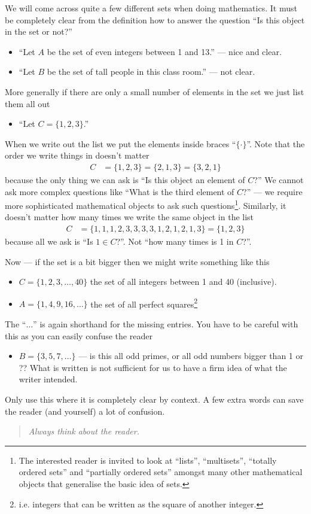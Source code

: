 We will come across quite a few different sets when doing
mathematics. It must be completely clear from the definition how
to answer the question ``Is this object in the set or not?''
\begin{itemize}
\item ``Let $A$ be the set of even integers between 1 and 13.'' --- nice and
clear.
\item ``Let $B$ be the set of tall people in this class room.'' --- not clear.
\end{itemize}
More generally if there are only a small number of elements in the set we just
list them all out
\begin{itemize}
\item ``Let $C = \{1,2,3\}$.''
\end{itemize}
When we write out the list we put the elements inside braces ``$\{ \cdot \}$''.
Note that the order we write things in doesn't matter
\begin{align*}
  C & = \{1,2,3\} = \{2,1,3\} = \{3,2,1\}
\end{align*}
because the only thing we can ask is ``Is this object an element of $C$?'' We
cannot ask more complex questions like ``What is the third element of $C$?'' ---
we require more sophisticated mathematical objects to ask such
questions\footnote{The interested reader is invited to look at ``lists'',
``multisets'', ``totally ordered sets'' and ``partially ordered sets''
amongst many other mathematical objects that generalise the basic idea of
sets.}. Similarly, it doesn't matter how many times we write the same object in
the list
\begin{align*}
  C &= \{1,1,1,2,3,3,3,3,1,2,1,2,1,3\} = \{1,2,3\}
\end{align*}
because all we ask is ``Is $1 \in C$?''. Not ``how many times is 1 in $C$?''.

Now --- if the set is a bit bigger then we might write something like this
\begin{itemize}
\item $C = \{1,2,3,\dots,40\}$ the set of all integers between 1 and 40
(inclusive).
\item $A = \{1,4,9,16,\dots\}$ the set of all perfect squares\footnote{i.e.
integers that can be written as the square of another integer.}
\end{itemize}
The ``$\dots$'' is again shorthand for the missing entries. You have to be
careful with this as you can easily confuse the reader
\begin{itemize}
\item $B = \{3,5,7,\dots\}$ --- is this all odd primes, or all odd numbers
bigger than 1 or ?? What is written is not sufficient for us to have a firm
idea of what the writer intended.
\end{itemize}
Only use this where it is completely clear by context. A few extra words can
save the reader (and yourself) a lot of confusion.
\begin{quote}
 \emph{Always think about the reader.}
\end{quote}



